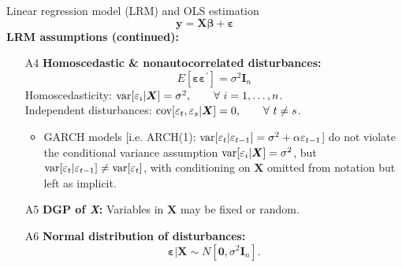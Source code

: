 \documentclass{beamer}
\begin{document}
\begin{frame}{Linear regression model (LRM) and OLS estimation}
$$
\bm{y} = \bm{X\beta} + \bm{\varepsilon}
$$
\textbf{LRM assumptions (continued):}
\medskip
\begin{enumerate}
    \item[A4] \textbf{Homoscedastic \& nonautocorrelated disturbances:}$$E[\bm{\varepsilon\varepsilon}^{\prime}]=\sigma^2\bm{I}_n$$ Homoscedasticity: $\textnormal{var}[\varepsilon_i|\bm{X}]=\sigma^2, \qquad \forall~i=1,\dots,n$.\\Independent disturbances: $\textnormal{cov}[\varepsilon_t,\varepsilon_s|\bm{X}]=0, \qquad \forall~t \neq s$.\\ \smallskip 
    \tiny{
    \begin{itemize}
        \item GARCH models [i.e. ARCH(1): $\textnormal{var}[\varepsilon_t|\varepsilon_{t-1}]=\sigma^2+\alpha \varepsilon_{t-1}$] do not violate the conditional variance assumption $\textnormal{var}[\varepsilon_i|\bm{X}]=\sigma^2$, but $\textnormal{var}[\varepsilon_t|\varepsilon_{t-1}] \neq \textnormal{var}[\varepsilon_t]$, with conditioning on $\bm{X}$ omitted from notation but left as implicit.
    \end{itemize}}
    \normalsize
    \item[A5] \textbf{DGP of \textit{X}:} Variables in $\bm{X}$ may be fixed or random.
    \item[A6] \textbf{Normal distribution of disturbances:} $$\bm{\varepsilon} | \bm{X} \sim N[\bm{0}, \sigma^2\bm{I}_n].$$
\end{enumerate}
\end{frame}
\end{document}
